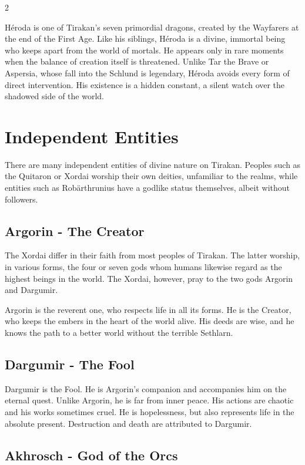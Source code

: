 \begin{multicols}{2}
{Héroda is one of Tirakan's seven primordial dragons, created by the Wayfarers at the end of the First Age. Like his siblings, Héroda is a divine, immortal being who keeps apart from the world of mortals. He appears only in rare moments when the balance of creation itself is threatened. Unlike Tar the Brave or Aspersia, whose fall into the Schlund is legendary, Héroda avoids every form of direct intervention. His existence is a hidden constant, a silent watch over the shadowed side of the world.

\section{Independent Entities}\label{sec:unabhangige-entitaten}

There are many independent entities of divine nature on Tirakan. Peoples such as the Quitaron or Xordai worship their own deities, unfamiliar to the realms, while entities such as Robärthrunius have a godlike status themselves, albeit without followers.

\subsection{Argorin - The Creator}\label{subsec:argorin-der-erschaffer}

The Xordai differ in their faith from most peoples of Tirakan. The latter worship, in various forms, the four or seven gods whom humans likewise regard as the highest beings in the world. The Xordai, however, pray to the two gods Argorin and Dargumir.

Argorin is the reverent one, who respects life in all its forms. He is the Creator, who keeps the embers in the heart of the world alive. His deeds are wise, and he knows the path to a better world without the terrible Sethlarn.

\subsection{Dargumir - The Fool}\label{subsec:dargumir-der-narr}

Dargumir is the Fool. He is Argorin's companion and accompanies him on the eternal quest. Unlike Argorin, he is far from inner peace. His actions are chaotic and his works sometimes cruel. He is hopelessness, but also represents life in the absolute present. Destruction and death are attributed to Dargumir.

\subsection{Akhrosch - God of the Orcs}\label{subsec:akhrosch-der-gott-der-orks}

}
\end{multicols}
